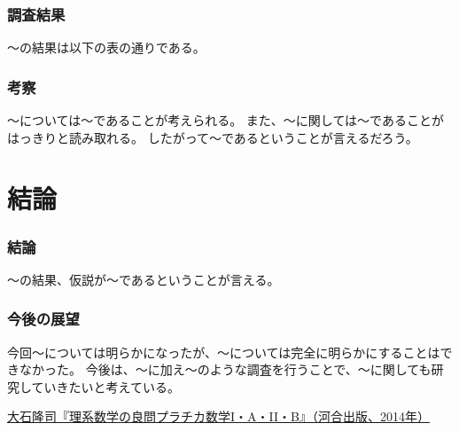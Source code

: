 \documentclass[10.5pt,twocolumn]{jsarticle}
\begin{document}
\section{調査結果}
〜の結果は以下の表の通りである。

\section{考察}
〜については〜であることが考えられる。
また、〜に関しては〜であることがはっきりと読み取れる。
したがって〜であるということが言えるだろう。

\part{結論}
\section{結論}
〜の結果、仮説が〜であるということが言える。
\section{今後の展望}
今回〜については明らかになったが、〜については完全に明らかにすることはできなかった。
今後は、〜に加え〜のような調査を行うことで、〜に関しても研究していきたいと考えている。

\begin{thebibliography}{2501}
 \url{大石隆司『理系数学の良問プラチカ数学I・A・II・B』（河合出版、2014年）}
\end{thebibliography}
\end{document}
